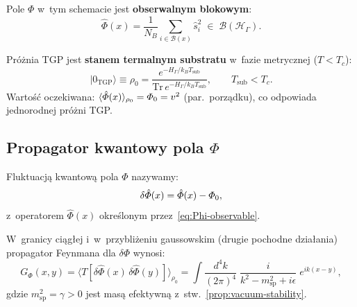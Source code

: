 Pole $\Phi$ w~tym schemacie jest \textbf{obserwalnym blokowym}:
\begin{equation}\label{eq:Phi-observable}
    \hat{\Phi}(x) = \frac{1}{N_B}
    \sum_{i \in \mathcal{B}(x)} \hat{s}_i^2
    \;\in\; \mathcal{B}(\mathcal{H}_\Gamma).
\end{equation}

\begin{proposition}\label{prop:substrate-vacuum}
Próżnia TGP jest \textbf{stanem termalnym substratu}
w~fazie metrycznej ($T < T_c$):
\begin{equation}\label{eq:vacuum-thermal}
    |0_{\mathrm{TGP}}\rangle
    \equiv \rho_0
    = \frac{e^{-H_\Gamma/k_B T_{\mathrm{sub}}}}
           {\mathrm{Tr}\,e^{-H_\Gamma/k_B T_{\mathrm{sub}}}},
    \qquad T_{\mathrm{sub}} < T_c.
\end{equation}
Wartość oczekiwana:
$\langle\hat{\varPhi}(x)\rangle_{\rho_0} = \varPhi_0 = v^2$
(par.\ porządku), co odpowiada jednorodnej próżni TGP.
\end{proposition}

\subsection{Propagator kwantowy pola $\Phi$}%
\label{app:E-propagator}

\begin{definition}\label{def:Phi-fluct}
Fluktuacją kwantową pola $\Phi$ nazywamy:
\begin{equation}\label{eq:delta-Phi}
    \delta\hat{\varPhi}(x)
    = \hat{\varPhi}(x) - \varPhi_0,
\end{equation}
z~operatorem $\hat{\Phi}(x)$ określonym przez~\eqref{eq:Phi-observable}.
\end{definition}

\begin{theorem}\label{thm:propagator}
W~granicy ciągłej i~w~przybliżeniu gaussowskim (drugie pochodne
działania) propagator Feynmana dla $\delta\Phi$ wynosi:
\begin{equation}\label{eq:propagator}
    G_\Phi(x, y)
    = \langle T[\delta\hat{\Phi}(x)\,\delta\hat{\Phi}(y)]\rangle_{\rho_0}
    = \int \frac{d^4k}{(2\pi)^4}\;
      \frac{i}{k^2 - m_{\mathrm{sp}}^2 + i\epsilon}\;
      e^{ik(x-y)},
\end{equation}
gdzie $m_{\mathrm{sp}}^2 = \gamma > 0$ jest masą efektywną
z~stw.~\ref{prop:vacuum-stability}.
\end{theorem}

